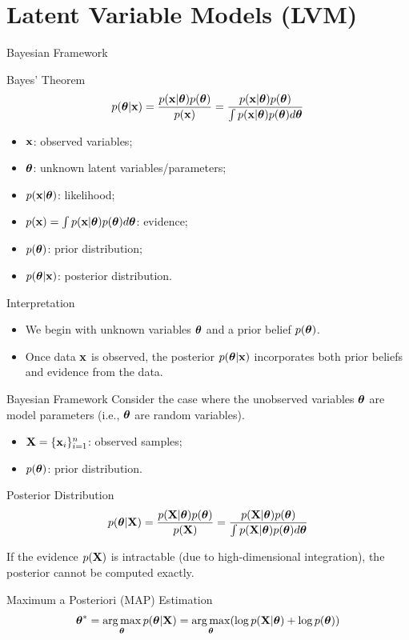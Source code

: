 \documentclass{beamer}
\begin{document}
\section{Latent Variable Models (LVM)}
\begin{frame}{Bayesian Framework}
	\begin{block}{Bayes' Theorem}
		\vspace{-0.3cm}
		\[
			p(\boldsymbol{\theta}| \mathbf{x}) = \frac{p(\mathbf{x} | \boldsymbol{\theta}) p(\boldsymbol{\theta})}{p(\mathbf{x})} = \frac{p(\mathbf{x} | \boldsymbol{\theta}) p(\boldsymbol{\theta})}{\int p(\mathbf{x} | \boldsymbol{\theta}) p(\boldsymbol{\theta}) d \boldsymbol{\theta}} 
		\]
		\vspace{-0.3cm}
		\begin{itemize}
			\item $\mathbf{x}$: observed variables; 
			\item $\boldsymbol{\theta}$: unknown latent variables/parameters;
			\item $p(\mathbf{x} | \boldsymbol{\theta})$: likelihood;
			\item $p(\mathbf{x}) = \int p(\mathbf{x} | \boldsymbol{\theta}) p(\boldsymbol{\theta}) d\boldsymbol{\theta}$: evidence;
			\item $p(\boldsymbol{\theta})$: prior distribution;
			\item $p(\boldsymbol{\theta}| \mathbf{x})$: posterior distribution.
		\end{itemize}
	\end{block}
    \eqpause
	\begin{block}{Interpretation}
		\begin{itemize}
			\item We begin with unknown variables $\boldsymbol{\theta}$ and a prior belief $p(\boldsymbol{\theta})$.
			\item Once data $\mathbf{x}$ is observed, the posterior $p(\boldsymbol{\theta}| \mathbf{x})$ incorporates both prior beliefs and evidence from the data.
		\end{itemize} 
	\end{block}
\end{frame}
\begin{frame}{Bayesian Framework}
	Consider the case where the unobserved variables $\boldsymbol{\theta}$ are model parameters (i.e., $\boldsymbol{\theta}$ are random variables).
	\begin{itemize}
		\item $\mathbf{X} = \{\mathbf{x}_i\}_{i=1}^n$: observed samples;
		\item $p(\boldsymbol{\theta})$: prior distribution.
	\end{itemize}
    \eqpause
	\begin{block}{Posterior Distribution}
		\[
			p(\boldsymbol{\theta} | \mathbf{X}) = \frac{p(\mathbf{X} | \boldsymbol{\theta}) p(\boldsymbol{\theta})}{p(\mathbf{X})} = \frac{p(\mathbf{X} | \boldsymbol{\theta}) p(\boldsymbol{\theta})}{\int p(\mathbf{X} | \boldsymbol{\theta}) p(\boldsymbol{\theta}) d \boldsymbol{\theta}} 
		\]
		\vspace{-0.2cm}
	\end{block}
    \eqpause
	If the evidence $p(\mathbf{X})$ is intractable (due to high-dimensional integration), the posterior cannot be computed exactly.
    \eqpause
    \begin{block}{Maximum a Posteriori (MAP) Estimation}
	    \vspace{-0.2cm}
	    \[
	        \boldsymbol{\theta}^* = \operatorname*{arg\,max}_{\boldsymbol{\theta}} p(\boldsymbol{\theta} | \mathbf{X}) = \operatorname*{arg\,max}_{\boldsymbol{\theta}} (\log p(\mathbf{X} | \boldsymbol{\theta}) + \log p(\boldsymbol{\theta}))
	    \]
    \end{block}
\end{frame}
\end{document}
